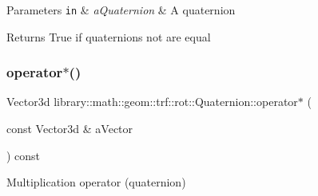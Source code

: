 \begin{DoxyParams}[1]{Parameters}
\mbox{\tt in}  & {\em a\+Quaternion} & A quaternion \\
\hline
\end{DoxyParams}
\begin{DoxyReturn}{Returns}
True if quaternions not are equal 
\end{DoxyReturn}
\mbox{\label{classlibrary_1_1math_1_1geom_1_1trf_1_1rot_1_1_quaternion_a6591efb9050f24e2b9d5c440dfeecc5f}} 
\subsubsection{\texorpdfstring{operator$\ast$()}{operator*()}}
{\footnotesize\ttfamily Vector3d library\+::math\+::geom\+::trf\+::rot\+::\+Quaternion\+::operator$\ast$ (\begin{DoxyParamCaption}\item[{const Vector3d \&}]{a\+Vector }\end{DoxyParamCaption}) const}



Multiplication operator (quaternion) 



